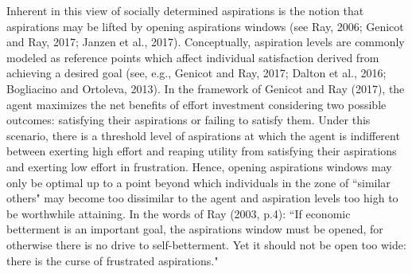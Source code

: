 \documentclass[11.5pt]{article}
\begin{document}
Inherent in this view of socially determined aspirations is the notion that aspirations may be lifted by opening aspirations windows (see Ray, 2006; Genicot and Ray, 2017; Janzen et al., 2017). Conceptually, aspiration levels are commonly modeled as reference points which affect individual satisfaction derived from achieving a desired goal (see, e.g., Genicot and Ray, 2017; Dalton et al., 2016; Bogliacino and Ortoleva, 2013). In the framework of Genicot and Ray (2017), the agent maximizes the net benefits of effort investment considering two possible outcomes: satisfying their aspirations or failing to satisfy them. Under this scenario, there is a threshold level of aspirations at which the agent is indifferent between exerting high effort and reaping utility from satisfying their aspirations and exerting low effort in frustration. Hence, opening aspirations windows may only be optimal up to a point beyond which individuals in the zone of ``similar others" may become too dissimilar to the agent and aspiration levels too high to be worthwhile attaining. In the words of Ray (2003, p.4): ``If economic betterment is an important goal, the aspirations window must be opened, for otherwise there is no drive to self-betterment. Yet it should not be open too wide: there is the curse of frustrated aspirations."
\end{document}
